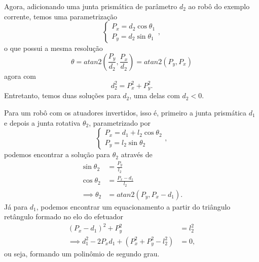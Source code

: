 Agora, adicionando uma junta prismática de parâmetro $d_2$ ao robô do exemplo corrente, temos uma parametrização \[
\begin{cases}
    P_x = d_2\cos\theta_1 \\
    P_y = d_2 \sin\theta_1
\end{cases}
,\] o que possui a mesma resolução \[
\theta = atan2\left( \frac{P_y}{d_2}, \frac{P_x}{d_2} \right) = atan2\left( P_y, P_x \right)
\] agora com \[
d_2^2 = P_x^2 + P_y^2
.\] Entretanto, temos duas soluções para $d_2$, uma delas com $d_2<0$.

Para um robô com os atuadores invertidos, isso é, primeiro a junta prismática $d_1$ e depois a junta rotativa $\theta_2$, parametrizado por \[
\begin{cases}
    P_x = d_1 + l_2\cos\theta_2 \\
    P_y = l_2 \sin\theta_2
\end{cases}
,\] podemos encontrar a solução para $\theta_2$ através de
\begin{align*}
    \sin\theta_2 &= \frac{P_y}{l_2} \\
    \cos\theta_2 &= \frac{P_x - d_1}{l_2} \\
    \implies \theta_2 &= atan2\left( P_y, P_x - d_1 \right) 
.\end{align*}
Já para $d_1$, podemos encontrar um equacionamento a partir do triângulo retângulo formado no elo do efetuador
\begin{align*}
    \left( P_x - d_1 \right) ^2 + P_y^2 &= l_2^2 \\
    \implies d_1^2 - 2P_x d_1 + \left( P_x^2 + P_y^2 - l_2^2 \right) &= 0
,\end{align*}
ou seja, formando um polinômio de segundo grau.

